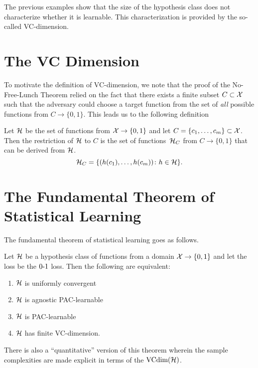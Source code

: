 The previous examples show that the size of the hypothesis class does not characterize
whether it is learnable. This characterization is provided by the so-called VC-dimension.

\section{The VC Dimension}

To motivate the definition of VC-dimension, we note that the proof of the No-Free-Lunch
Theorem relied on the fact that there exists a finite subset $C \subset \mathcal{X}$ such
that the adversary could choose a target function from the set of \emph{all} possible
functions from $C \rightarrow \{0, 1\}$. This leads us to the following
definition
\begin{definition} Let $\mathcal{H}$ be the
set of functions from $\mathcal{X} \rightarrow \{0, 1\}$ and let
$C = \{c_1, \ldots, c_m\} \subset \mathcal{X}$. Then
the restriction of $\mathcal{H}$ to $C$ is the set of functions~$\mathcal{H}_C$
from $C \to \{0, 1\}$  that can be derived from $\mathcal{H}$.
\[
    \mathcal{H}_C = \{(h(c_1), \ldots, h(c_m)) \colon h \in \mathcal{H}\}.
\]
\end{definition}

\section{The Fundamental Theorem of Statistical Learning}

The fundamental theorem of statistical learning goes as follows.
\begin{theorem}
Let $\mathcal{H}$ be a hypothesis class of functions from a domain
$\mathcal{X} \rightarrow \{0, 1\}$ and let the loss be the $\operatorname{0-1}$ loss. Then the
following are equivalent:
\begin{enumerate}
    \item $\mathcal{H}$ is uniformly convergent
    \item $\mathcal{H}$ is agnostic PAC-learnable
    \item $\mathcal{H}$ is PAC-learnable
    \item $\mathcal{H}$ has finite VC-dimension.
\end{enumerate}
\end{theorem}

There is also a ``quantitative'' version of this theorem wherein the sample
complexities are made explicit in terms of the $\text{VCdim}(\mathcal{H})$.

